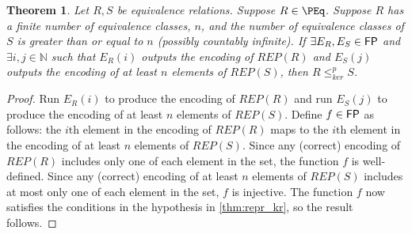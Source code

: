 \documentclass{amsart}
\newtheorem{theorem}{Theorem}[section]
\theoremstyle{definition} \newtheorem{definition}[definition]{Definition}
\newcommand{\kr}{\leq^{p}_{ker}} %
\newcommand{\defn}[1]{\emph{#1}} %
\begin{document}
\begin{theorem}
  Let $R,S$ be equivalence relations. Suppose $R\in\PEq$. Suppose $R$ has a
  finite number of equivalence classes, $n$, and the number of equivalence
  classes of $S$ is greater than or equal to $n$ (possibly countably
  infinite). If $\exists E_R,E_S\in{\ensuremath{\mathsf{FP}}}$ and $\exists i,j\in\mathbb{N}$ such
  that $E_R(i)$ outputs the encoding of $REP(R)$ and $E_S(j)$ outputs the
  encoding of at least $n$ elements of $REP(S)$, then $R\kr S$.
\end{theorem}
\begin{proof}
  Run $E_R(i)$ to produce the encoding of $REP(R)$ and run $E_S(j)$ to produce
  the encoding of at least $n$ elements of $REP(S)$. Define $f\in{\ensuremath{\mathsf{FP}}}$ as
  follows: the $i\text{th}$ element in the encoding of $REP(R)$ maps to the
  $i\text{th}$ element in the encoding of at least $n$ elements of
  $REP(S)$. Since any (correct) encoding of $REP(R)$ includes only one of each
  element in the set, the function $f$ is well-defined. Since any (correct)
  encoding of at least $n$ elements of $REP(S)$ includes at most only one of
  each element in the set, $f$ is injective. The function $f$ now satisfies the
  conditions in the hypothesis in \autoref{thm:repr_kr}, so the result follows.
\end{proof}




\end{document}
